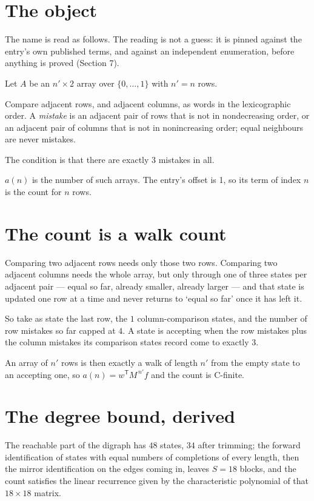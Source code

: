 \documentclass[11pt]{article}
\theoremstyle{definition}
\begin{document}
\section{The object}

The name is read as follows. The reading is not a guess: it is pinned against the entry's own published terms, and against an independent enumeration, before anything is proved (Section 7).

Let $A$ be an $n' \times 2$ array over $\{0,\dots,1\}$ with $n' = n$ rows.

Compare adjacent rows, and adjacent columns, as words in the lexicographic order. A {\itshape mistake} is an adjacent pair of rows that is not in nondecreasing order, or an adjacent pair of columns that is not in nonincreasing order; equal neighbours are never mistakes.

The condition is that there are exactly $3$ mistakes in all.

$a(n)$ is the number of such arrays. The entry's offset is 1, so its term of index $n$ is the count for $n$ rows.

\section{The count is a walk count}

Comparing two adjacent rows needs only those two rows. Comparing two adjacent columns needs the whole array, but only through one of three states per adjacent pair --- equal so far, already smaller, already larger --- and that state is updated one row at a time and never returns to `equal so far' once it has left it.

So take as state the last row, the $1$ column-comparison states, and the number of row mistakes so far capped at $4$. A state is accepting when the row mistakes plus the column mistakes its comparison states record come to exactly $3$.

An array of $n'$ rows is then exactly a walk of length $n'$ from the empty state to an accepting one, so $a(n) = w^{\mathsf T}M^{\,n'}f$ and the count is C-finite.

\section{The degree bound, derived}

The reachable part of the digraph has $48$ states, $34$ after trimming; the forward identification of states with equal numbers of completions of every length, then the mirror identification on the edges coming in, leaves $S = 18$ blocks, and the count satisfies the linear recurrence given by the characteristic polynomial of that $18\times18$ matrix.
\end{document}
